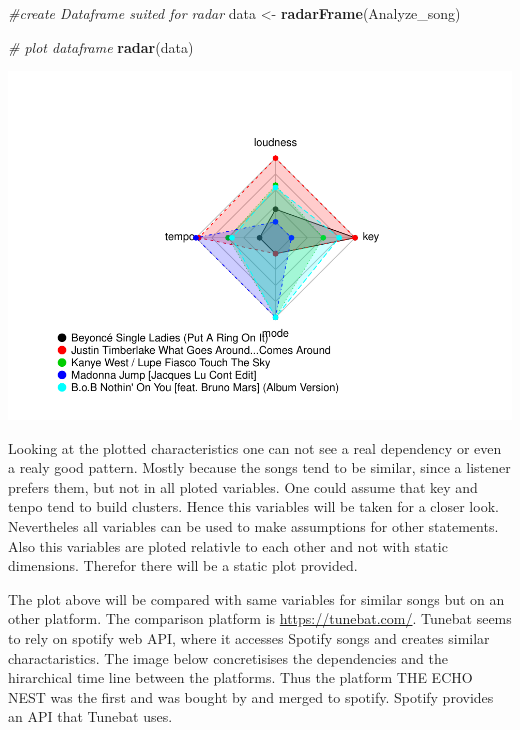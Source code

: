 \documentclass[]{article}
\newenvironment{Shaded}{\begin{snugshade}}{\end{snugshade}}
\newcommand{\KeywordTok}[1]{\textcolor[rgb]{0.13,0.29,0.53}{\textbf{#1}}}
\newcommand{\StringTok}[1]{\textcolor[rgb]{0.31,0.60,0.02}{#1}}
\newcommand{\CommentTok}[1]{\textcolor[rgb]{0.56,0.35,0.01}{\textit{#1}}}
\newcommand{\NormalTok}[1]{#1}
\begin{document}
\begin{Shaded}
\begin{Highlighting}[]
\CommentTok{#create Dataframe suited for radar}
\NormalTok{data <-}\StringTok{ }\KeywordTok{radarFrame}\NormalTok{(Analyze_song)}

\CommentTok{# plot dataframe}
\KeywordTok{radar}\NormalTok{(data)}
\end{Highlighting}
\end{Shaded}

\includegraphics{Project2_files/figure-latex/crateRadar-1.pdf}

Looking at the plotted characteristics one can not see a real dependency
or even a realy good pattern. Mostly because the songs tend to be
similar, since a listener prefers them, but not in all ploted variables.
One could assume that key and tenpo tend to build clusters. Hence this
variables will be taken for a closer look. Nevertheles all variables can
be used to make assumptions for other statements. Also this variables
are ploted relativle to each other and not with static dimensions.
Therefor there will be a static plot provided.

The plot above will be compared with same variables for similar songs
but on an other platform. The comparison platform is
\url{https://tunebat.com/}. Tunebat seems to rely on spotify web API,
where it accesses Spotify songs and creates similar charactaristics. The
image below concretisises the dependencies and the hirarchical time line
between the platforms. Thus the platform THE ECHO NEST was the first and
was bought by and merged to spotify. Spotify provides an API that
Tunebat uses.
\end{document}
